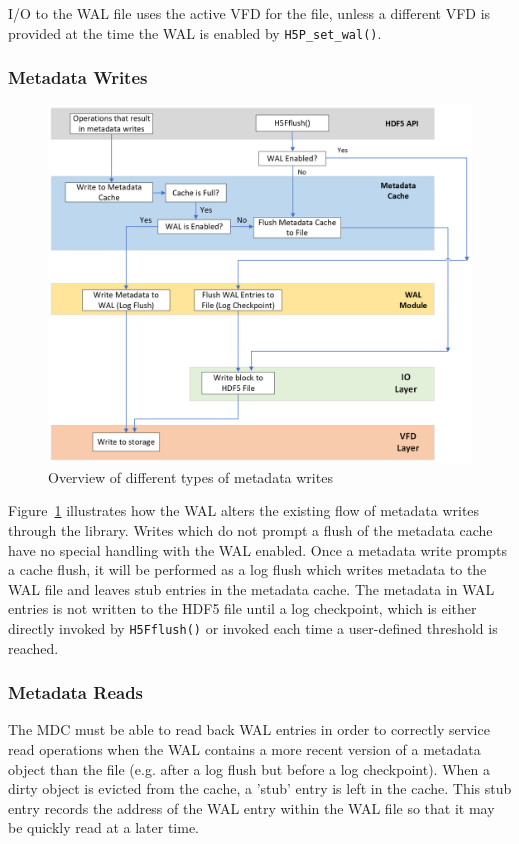 I/O to the WAL file uses the active VFD for the file, unless a different VFD is provided at the time the WAL is enabled by \texttt{H5P\_set\_wal()}. 

\subsubsection{Metadata Writes}

\begin{figure}
    \centering
    \includegraphics[width=1.0\textwidth]{images/wal_design.png}
    \caption{Overview of different types of metadata writes}
    \label{fig:wal-diagram}
\end{figure}

Figure~\ref{fig:wal-diagram} illustrates how the WAL alters the existing flow of metadata writes through the library.  Writes which do not prompt a flush of the metadata cache have no special handling with the WAL enabled. Once a metadata write prompts a cache flush, it will be performed as a log flush which writes metadata to the WAL file and leaves stub entries in the metadata cache. The metadata in WAL entries is not written to the HDF5 file until a log checkpoint, which is either directly invoked by \texttt{H5Fflush()} or invoked each time a user-defined threshold is reached.


\subsubsection{Metadata Reads}
The MDC must be able to read back WAL entries in order to correctly service read operations when the WAL contains a more recent version of a metadata object than the file (e.g. after a log flush but before a log checkpoint). When a dirty object is evicted from the cache, a 'stub' entry is left in the cache. This stub entry records the address of the WAL entry within the WAL file so that it may be quickly read at a later time.

